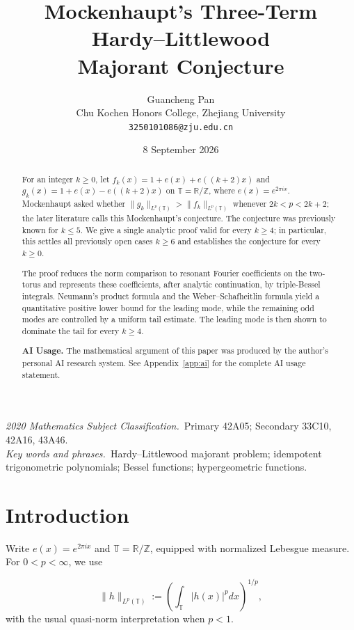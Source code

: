 \documentclass[11pt]{article}
\title{\vspace{-2em}Mockenhaupt's Three-Term Hardy--Littlewood\\
       Majorant Conjecture}
\author{Guancheng Pan\\[0.6ex]
  {\small Chu Kochen Honors College, Zhejiang University}\\[0.4ex]
  {\small\texttt{3250101086@zju.edu.cn}}}
\date{8 September 2026}
\theoremstyle{plain}
\theoremstyle{definition}
\theoremstyle{remark}
\begin{document}
\maketitle
\begin{abstract}
For an integer $k \ge 0$, let $f_k(x) = 1 + e(x) + e((k+2)x)$ and $g_k(x) = 1 + e(x) - e((k+2)x)$ on $\mathbb{T} = \mathbb{R}/\mathbb{Z}$, where $e(x) = e^{2\pi ix}$. Mockenhaupt asked whether $\|g_k\|_{L^p(\mathbb{T})} > \|f_k\|_{L^p(\mathbb{T})}$ whenever $2k < p < 2k+2$; the later literature calls this Mockenhaupt's conjecture. The conjecture was previously known for $k \le 5$. We give a single analytic proof valid for every $k \ge 4$; in particular, this settles all previously open cases $k \ge 6$ and establishes the conjecture for every $k \ge 0$.

The proof reduces the norm comparison to resonant Fourier coefficients on the two-torus and represents these coefficients, after analytic continuation, by triple-Bessel integrals. Neumann's product formula and the Weber--Schafheitlin formula yield a quantitative positive lower bound for the leading mode, while the remaining odd modes are controlled by a uniform tail estimate. The leading mode is then shown to dominate the tail for every $k \ge 4$.

\textbf{AI Usage.} The mathematical argument of this paper was produced by the author's personal AI research system. See Appendix~\ref{app:ai} for the complete AI usage statement.
\end{abstract}

\begin{center}\small
\emph{2020 Mathematics Subject Classification.}\ Primary 42A05;
Secondary 33C10, 42A16, 43A46.\\
\emph{Key words and phrases.}\ Hardy--Littlewood majorant problem; idempotent
trigonometric polynomials; Bessel functions; hypergeometric functions.
\end{center}


\section{Introduction}\label{sec:intro}

Write $e(x) = e^{2\pi ix}$ and $\mathbb{T} = \mathbb{R}/\mathbb{Z}$, equipped with normalized Lebesgue measure. For $0 < p < \infty$, we use

\[
  \|h\|_{L^p(\mathbb{T})} := \left( \int_{\mathbb{T}} |h(x)|^p dx \right)^{1/p} ,
\]
with the usual quasi-norm interpretation when $p < 1$.
\end{document}
